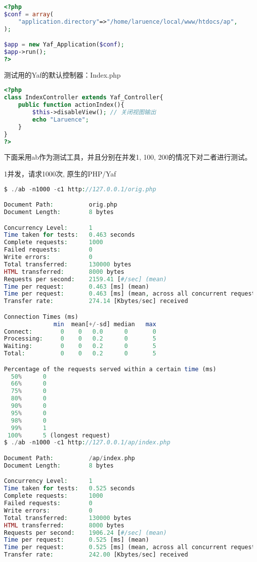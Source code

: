 \begin{lstlisting}[language=PHP]
<?php
$conf = array(
	"application.directory"=>"/home/laruence/local/www/htdocs/ap",
);

$app = new Yaf_Application($conf);
$app->run();
?>
\end{lstlisting}

测试用的Yaf的默认控制器：Index.php

\begin{lstlisting}[language=PHP]
<?php
class IndexController extends Yaf_Controller{
	public function actionIndex(){
		$this->disableView(); // 关闭视图输出
		echo "Laruence";
	}
}
?>
\end{lstlisting}

下面采用ab作为测试工具，并且分别在并发1, 100, 200的情况下对二者进行测试。

\begin{compactitem}
\item 1并发，请求1000次, 原生的PHP/Yaf

\begin{lstlisting}[language=PHP]
$ ./ab -n1000 -c1 http://127.0.0.1/orig.php

Document Path:          orig.php
Document Length:        8 bytes

Concurrency Level:      1
Time taken for tests:   0.463 seconds
Complete requests:      1000
Failed requests:        0
Write errors:           0
Total transferred:      130000 bytes
HTML transferred:       8000 bytes
Requests per second:    2159.41 [#/sec] (mean)
Time per request:       0.463 [ms] (mean)
Time per request:       0.463 [ms] (mean, across all concurrent requests)
Transfer rate:          274.14 [Kbytes/sec] received

Connection Times (ms)
              min  mean[+/-sd] median   max
Connect:        0    0   0.0      0       0
Processing:     0    0   0.2      0       5
Waiting:        0    0   0.2      0       5
Total:          0    0   0.2      0       5

Percentage of the requests served within a certain time (ms)
  50%      0
  66%      0
  75%      0
  80%      0
  90%      0
  95%      0
  98%      0
  99%      1
 100%      5 (longest request)
$ ./ab -n1000 -c1 http://127.0.0.1/ap/index.php

Document Path:          /ap/index.php
Document Length:        8 bytes

Concurrency Level:      1
Time taken for tests:   0.525 seconds
Complete requests:      1000
Failed requests:        0
Write errors:           0
Total transferred:      130000 bytes
HTML transferred:       8000 bytes
Requests per second:    1906.24 [#/sec] (mean)
Time per request:       0.525 [ms] (mean)
Time per request:       0.525 [ms] (mean, across all concurrent requests)
Transfer rate:          242.00 [Kbytes/sec] received


\end{lstlisting}
\end{compactitem}
